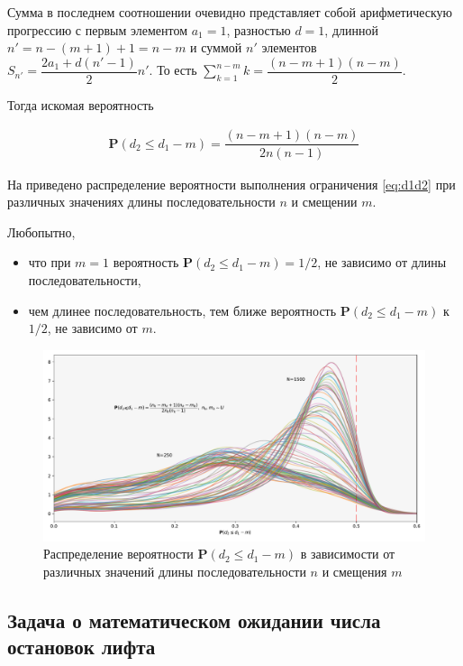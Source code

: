 \documentclass[%
	11pt,
	a4paper,
	utf8,
		]{article}
\begin{document}
Сумма в последнем соотношении очевидно представляет собой арифметическую прогрессию с первым элементом $ a_1 = 1 $, разностью $ d = 1 $, длинной $ n' = n - (m + 1) + 1 = n - m $ и суммой $ n' $ элементов $ S_{n'} = \dfrac{2 a_1 + d (n' - 1)}{2} n' $. То есть $ \sum\limits_{k=1}^{n - m} k = \dfrac{(n - m + 1)(n - m)}{2} $.

Тогда искомая вероятность

\begin{align}\label{eq:pd2leqd1}
	\boxed{\mathbf{P}(d_2 \leqslant d_1 - m) = \dfrac{(n - m + 1)(n - m)}{2n(n-1)}}
\end{align}


На  приведено распределение вероятности выполнения ограничения \eqref{eq:d1d2} при различных значениях длины последовательности $ n $ и смещении $ m $.

Любопытно,
\begin{itemize}
	\item что при $ m = 1 $ вероятность $ \mathbf{P}(d_2 \leqslant d_1 - m) = 1/2 $, не зависимо от длины последовательности,
	
	\item чем длинее последовательность, тем ближе вероятность $ \mathbf{P}(d_2 \leqslant d_1 - m) $ к $ 1/2 $, не зависимо от $ m $.
\end{itemize}

\begin{figure}[!h]
	\centering
	\includegraphics[scale=0.5]{figures/kde_d2_leq_d1_minus_m.pdf}
	\caption{ Распределение вероятности $ \mathbf{P}(d_2 \leqslant d_1 - m) $ в зависимости от различных значений длины последовательности $ n $ и смещения $ m $ }\label{fig:kde_d2_leq_d1_minus_m}
\end{figure}

\subsection{Задача о математическом ожидании числа остановок лифта}
\end{document}
